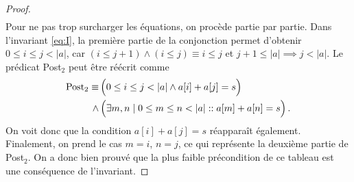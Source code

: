 \documentclass{elsarticle}
\newcommand{\abs}[1]{\left\lvert#1\right\lvert}
\begin{document}
\begin{minipage}[c]{0.65\textwidth}
\begin{proof}
\begin{align*}
\end{align*}
Pour ne pas trop surcharger les équations, on procède partie par partie.
Dans l'invariant \ref{eq:I}, la première partie de la conjonction permet d'obtenir $0 \le i \le j < \abs{a}$,
car $(i \le j+1) \land (i \le j) \equiv i \le j$ et $j+1 \le \abs{a} \implies j < \abs{a}$.
Le prédicat Post$_2$ peut être réécrit comme
\begin{align*}
\textnormal{Post}_2 \equiv&\,\Big(0 \le i \le j < \abs{a} \land a[i] + a[j] = s\Big)\\
\land&\,\Big(\exists m, n \mid 0 \le m \le n < \abs{a} :: a[m] + a[n] = s\Big)\,.
\end{align*}
On voit donc que la condition $a[i] + a[j] = s$ réapparaît également.
Finalement, on prend le cas $m = i$, $n = j$, ce qui représente la deuxième partie de Post$_2$.
 On a donc bien prouvé que la plus faible précondition de ce tableau est une conséquence de l'invariant.
\end{proof}
\end{minipage}
\end{document}
